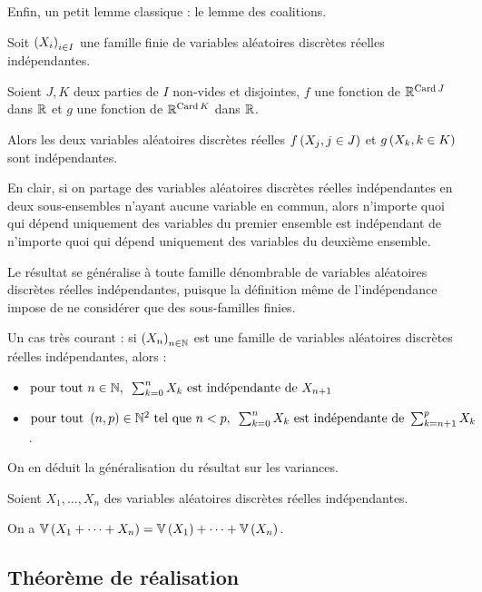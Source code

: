 Enfin, un petit lemme classique : le lemme des coalitions.

\begin{prop}
Soit \(\left(X_i\right)_{i\in I}\) une famille finie de variables aléatoires discrètes réelles indépendantes.

Soient \(J,K\) deux parties de \(I\) non-vides et disjointes, \(f\) une fonction de \(\mathbb{R}^{\operatorname{Card} J}\) dans \(\mathbb{R}\) et \(g\) une fonction de \(\mathbb{R}^{\operatorname{Card} K}\) dans \(\mathbb{R}\).

Alors les deux variables aléatoires discrètes réelles \(f\left(X_j,j\in J\right)\) et \(g\left(X_k,k\in K\right)\) sont indépendantes.
\end{prop}

En clair, si on partage des variables aléatoires discrètes réelles indépendantes en deux sous-ensembles n'ayant aucune variable en commun, alors n'importe quoi qui dépend uniquement des variables du premier ensemble est indépendant de n'importe quoi qui dépend uniquement des variables du deuxième ensemble.

Le résultat se généralise à toute famille dénombrable de variables aléatoires discrètes réelles indépendantes, puisque la définition même de l'indépendance impose de ne considérer que des sous-familles finies.

\begin{ex}
Un cas très courant : si \(\left(X_n\right)_{n\in\mathbb{N}}\) est une famille de variables aléatoires discrètes réelles indépendantes, alors :

\begin{itemize}
    \item \(\quantifs{\tpt n\in\N}\sum_{k=0}^nX_k\text{ est indépendante de }X_{n+1}\) \\
    \item \(\quantifs{\tpt\paren{n,p}\in\N^2\text{ tel que }n<p}\sum_{k=0}^nX_k\text{ est indépendante de }\sum_{k=n+1}^pX_k\).
\end{itemize}
\end{ex}

On en déduit la généralisation du résultat sur les variances.

\begin{prop}
Soient \(X_1,\dots,X_n\) des variables aléatoires discrètes réelles indépendantes.

On a \(\operatorname{\mathbb{V}}\left(X_1+\dots+X_n\right)=\operatorname{\mathbb{V}}\left(X_1\right)+\dots+\operatorname{\mathbb{V}}\left(X_n\right)\).
\end{prop}

\subsection{Théorème de réalisation}

